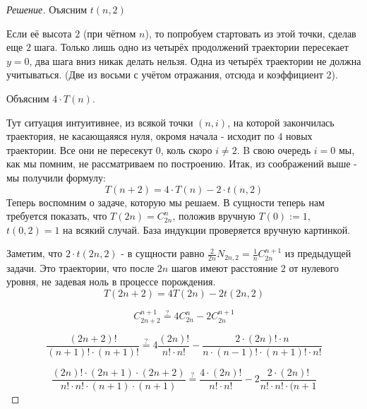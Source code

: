 \documentclass{article}
\begin{document}
\begin{proof}[Решение]
        \vspace{\baselineskip}
        
        Оъясним $t(n, 2)$
        
        
        Если её высота $2$ (при чётном $n$), то попробуем стартовать из этой точки, сделав еще $2$ шага. Только лишь одно из четырёх продолжений траектории пересекает $y = 0$, два шага вниз никак делать нельзя. Одна из четырёх траектории не должна учитываться. (Две из восьми с учётом отражания, отсюда и коэффициент 2).
        
        \vspace{\baselineskip}
        
        Объясним $4 \cdot T(n)$.
        
        Тут ситуация интуитивнее, из всякой точки $(n, i)$, на которой закончилась траектория, не касающаяяся нуля, окромя начала - исходит по $4$ новых траектории. Все они не пересекут $0$, коль скоро $i \neq 2$. B свою очередь $i = 0$ мы, как мы помним, не рассматриваем по построению.
        \vspace{\baselineskip}
        Итак, из соображений выше - мы получили формулу:
\[
         T(n+2) = 4 \cdot T(n) - 2 \cdot t(n, 2)
\]
        Теперь воспомним о задаче, которую мы решаем. В сущности теперь нам требуется показать, что $T(2n) = C_{2n}^{n}$, положив вручную $T(0) := 1$, $t(0, 2) = 1$ на всякий случай. База индукции проверяется вручную картинкой.
        
        Заметим, что $2 \cdot t(2n, 2)$ - в сущности равно $\frac{2}{2n} N_{2n, 2} = \frac{1}{n} C_{2n}^{n+1}$ из предыдущей задачи. Это траектории, что после $2n$ шагов имеют расстояние $2$ от нулевого уровня, не задевая ноль в процессе порождения.
\[
        T(2n + 2) = 4 T(2n) - 2t(2n, 2) 
\]

\[
        C_{2n + 2}^{n+1} \stackrel{?}{=} 4 C_{2n}^{n} - 2 C_{2n}^{n+1}
\]

\[
        \frac{(2n+2)!}{(n+1)! \cdot (n+1)!} \stackrel{?}{=} 4\frac{(2n)!}{n! \cdot n!} - \frac{2 \cdot (2n)! \cdot n}{n \cdot (n-1)! \cdot (n+1)! \cdot n!}
\]

\[
        \frac{(2n)! \cdot (2n + 1) \cdot (2n + 2)}{ n! \cdot n! \cdot (n+1) \cdot (n+1)} \stackrel{?}{=} \frac{4 \cdot (2n)!}{n! \cdot n!} - 2 \frac{2 \cdot (2n)!}{n! \cdot n! \cdot (n+1}
\]


\end{proof}
\end{document}
